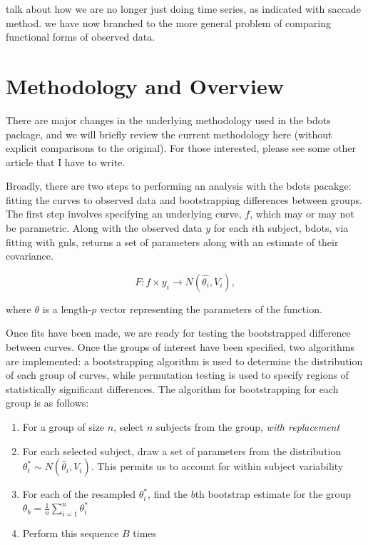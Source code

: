 \documentclass{article}
\begin{document}
talk about how we are no longer just doing time series, as indicated with saccade method. we have now branched to the more general problem of comparing functional forms of observed data.

\section{Methodology and Overview} 

There are major changes in the underlying methodology used in the bdots package, and we will briefly review the current methodology here (without explicit comparisons to the original). For those interested, please see some other article that I have to write.

Broadly, there are two steps to performing an analysis with the bdots pacakge: fitting the curves to observed data and bootstrapping differences between groups. The first step involves specifying an underlying curve, $f$, which may or may not be parametric. Along with the observed data $y$ for each $i$th subject, bdots, via fitting with gnls, returns a set of parameters along with an estimate of their covariance.

\begin{equation}
F: f \times y_i \rightarrow N(\hat{\theta_i}, V_{i}),
\end{equation}

where $\theta$ is a length-$p$ vector representing the parameters of the function.


Once fits have been made, we are ready for testing the bootstrapped difference between curves. Once the groups of interest have been specified, two algorithms are implemented: a bootstrapping algorithm is used to determine the distribution of each group of curves, while permutation testing is used to specify regions of statistically significant differences. The algorithm for  bootstrapping for each group is as follows:

\begin{enumerate}
\item For a group of size $n$, select $n$ subjects from the group, \textit{with replacement}
\item For each selected subject, draw a set of parameters from the distribution $\theta_{i}^* \sim N(\hat{\theta}_i, V_i)$. This permits us to account for within subject variability
\item For each of the resampled $\theta_i^*$, find the $b$th bootstrap estimate for the group $\theta_b = \frac1n \sum_{i=1}^n \theta_i^*$
\item Perform this sequence $B$ times
\end{enumerate}
\end{document}
